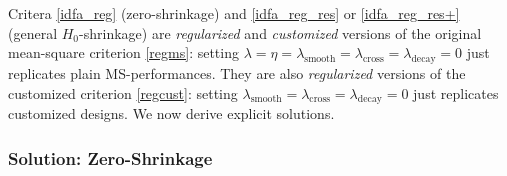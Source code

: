 \documentclass[11pt]{article}
\begin{document}
Critera \ref{idfa_reg} (zero-shrinkage) and \ref{idfa_reg_res} or  \ref{idfa_reg_res+} (general $H_0$-shrinkage) are \emph{regularized} and \emph{customized} versions of the original mean-square criterion \ref{regms}: setting $\lambda=\eta=\lambda_{\textrm{smooth}}=\lambda_{\textrm{cross}}=\lambda_{\textrm{decay}}=0$ just replicates plain MS-performances. They are also \emph{regularized} versions of the customized criterion \ref{regcust}: setting $\lambda_{\textrm{smooth}}=\lambda_{\textrm{cross}}=\lambda_{\textrm{decay}}=0$ just replicates customized designs. We now derive explicit solutions.


\subsubsection{Solution: Zero-Shrinkage}
\end{document}
